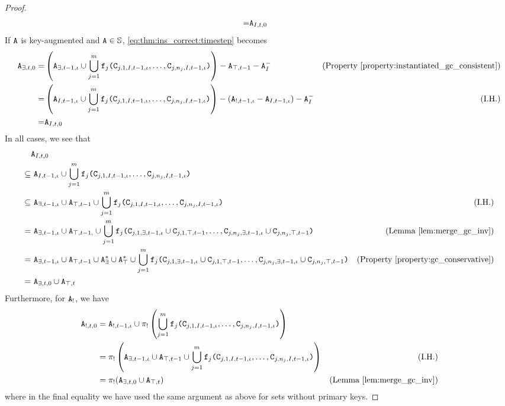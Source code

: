 \begin{proof}
\begin{align*}
=& \tt{A}_{I,t,0}
\end{align*}
If $\tt{A}$ is key-augmented and $\tt{A} \in \mathbb{S}$, \eqref{eq:thm:ins_correct:timestep} becomes
\begin{align*}
\tt{A}_{\exists,t,0}
=& \left(\tt{A}_{\exists,t-1,\iota} \cup \bigcup_{j=1}^m \tt{f}_j\tt{(}\tt{C}_{j,1,I,t-1,\iota}, \dots, \tt{C}_{j,n_j,I,t-1,\iota}\tt{)}\right)
- \tt{A}_{\top,t-1} - \tt{A}_I^- & \text{(Property \ref{property:instantiated_gc_consistent})} 
\\
=& \left(\tt{A}_{I,t-1,\iota} \cup \bigcup_{j=1}^m \tt{f}_j\tt{(}\tt{C}_{j,1,I,t-1,\iota}, \dots, \tt{C}_{j,n_j,I,t-1,\iota}\tt{)}\right)
-(\tt{A}_{!,t-1,\iota} - \tt{A}_{I,t-1,\iota}) - \tt{A}_I^- & \text{(I.H.)}\\
=& \tt{A}_{I,t,0}
\end{align*}
In all cases, we see that
\begin{align*}
&\tt{A}_{I,t,0}\\
\subseteq&~ \tt{A}_{I,t-1,\iota} \cup \bigcup_{j=1}^m \tt{f}_j\tt{(}\tt{C}_{j,1,I,t-1,\iota}, \dots, \tt{C}_{j,n_j,I,t-1,\iota}\tt{)} \\
\subseteq&~ \tt{A}_{\exists,t-1,\iota} \cup \tt{A}_{\top,t-1} \cup \bigcup_{j=1}^m \tt{f}_j\tt{(}\tt{C}_{j,1,I,t-1,\iota}, \dots, \tt{C}_{j,n_j,I,t-1,\iota}\tt{)} & \text{(I.H.)} \\
=&~ \tt{A}_{\exists,t-1,\iota} \cup \tt{A}_{\top,t-1,} \cup \bigcup_{j=1}^m \tt{f}_j\tt{(}\tt{C}_{j,1,\exists,t-1,\iota} \cup \tt{C}_{j,1,\top,t-1}, \dots, \tt{C}_{j,n_j,\exists,t-1,\iota} \cup \tt{C}_{j,n_j,\top,t-1}\tt{)} & \text{(Lemma \ref{lem:merge_gc_inv})} \\
=&~ \tt{A}_{\exists,t-1,\iota} \cup \tt{A}_{\top,t-1} \cup \tt{A}_\exists^* \cup \tt{A}_\top^* \cup \bigcup_{j=1}^m \tt{f}_j\tt{(}\tt{C}_{j,1,\exists,t-1,\iota} \cup \tt{C}_{j,1,\top,t-1}, \dots, \tt{C}_{j,n_j,\exists,t-1,\iota} \cup \tt{C}_{j,n_j,\top,t-1}\tt{)} & \text{(Property \ref{property:gc_conservative})}\\
=&~ \tt{A}_{\exists,t,0} \cup \tt{A}_{\top,t}
\end{align*}
Furthermore, for $\tt{A}_!$, we have
\begin{align*}
\tt{A}_{!,t,0}
&= \tt{A}_{!,t-1,\iota} \cup \pi_!\left(\bigcup_{j=1}^m \tt{f}_j\tt{(}\tt{C}_{j,1,I,t-1,\iota}, \dots, \tt{C}_{j,n_j,I,t-1,\iota}\tt{)}\right)\\
&= \pi_!\left(\tt{A}_{\exists,t-1,\iota} \cup \tt{A}_{\top,t-1} \cup \bigcup_{j=1}^m \tt{f}_j\tt{(}\tt{C}_{j,1,I,t-1,\iota}, \dots, \tt{C}_{j,n_j,I,t-1,\iota}\tt{)}\right) & \text{(I.H.)} \\
&= \pi_!(\tt{A}_{\exists,t,0} \cup \tt{A}_{\top,t}) & \text{(Lemma \ref{lem:merge_gc_inv})}
\end{align*}
where in the final equality we have used the same argument as above for sets without primary keys.
\end{proof}

